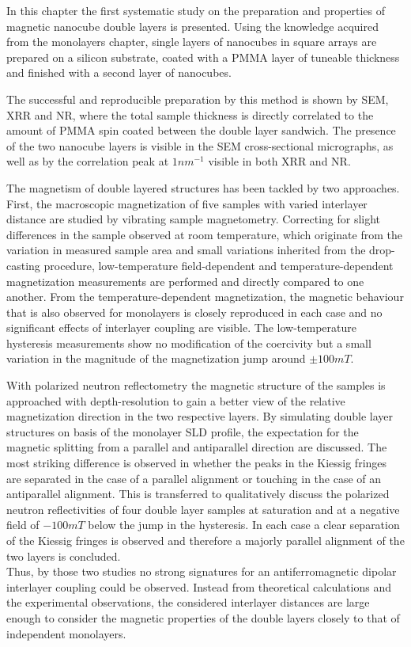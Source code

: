 \documentclass[\main/dresen_thesis.tex]{subfiles}
\begin{document}
  In this chapter the first systematic study on the preparation and properties of magnetic nanocube double layers is presented.
  Using the knowledge acquired from the monolayers chapter, single layers of nanocubes in square arrays are prepared on a silicon substrate, coated with a PMMA layer of tuneable thickness and finished with a second layer of nanocubes.

  The successful and reproducible preparation by this method is shown by SEM, XRR and NR, where the total sample thickness is directly correlated to the amount of PMMA spin coated between the double layer sandwich.
  The presence of the two nanocube layers is visible in the SEM cross-sectional micrographs, as well as by the correlation peak at $1 \unit{nm^{-1}}$ visible in both XRR and NR.

  The magnetism of double layered structures has been tackled by two approaches.
  First, the macroscopic magnetization of five samples with varied interlayer distance are studied by vibrating sample magnetometry.
  Correcting for slight differences in the sample observed at room temperature, which originate from the variation in measured sample area and small variations inherited from the drop-casting procedure, low-temperature field-dependent and temperature-dependent magnetization measurements are performed and directly compared to one another.
  From the temperature-dependent magnetization, the magnetic behaviour that is also observed for monolayers is closely reproduced in each case and no significant effects of interlayer coupling are visible.
  The low-temperature hysteresis measurements show no modification of the coercivity but a small variation in the magnitude of the magnetization jump around $\pm 100 \unit{mT}$.

  With polarized neutron reflectometry the magnetic structure of the samples is approached with depth-resolution to gain a better view of the relative magnetization direction in the two respective layers.
  By simulating double layer structures on basis of the monolayer SLD profile, the expectation for the magnetic splitting from a parallel and antiparallel direction are discussed.
  The most striking difference is observed in whether the peaks in the Kiessig fringes are separated in the case of a parallel alignment or touching in the case of an antiparallel alignment.
  This is transferred to qualitatively discuss the polarized neutron reflectivities of four double layer samples at saturation and at a negative field of $-100 \unit{mT}$ below the jump in the hysteresis.
  In each case a clear separation of the Kiessig fringes is observed and therefore a majorly parallel alignment of the two layers is concluded.
  \\

  Thus, by those two studies no strong signatures for an antiferromagnetic dipolar interlayer coupling could be observed.
  Instead from theoretical calculations and the experimental observations, the considered interlayer distances are large enough to consider the magnetic properties of the double layers closely to that of independent monolayers.
\end{document}
